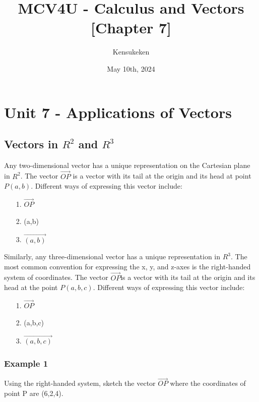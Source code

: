 \documentclass{article}
\title{MCV4U - Calculus and Vectors [Chapter 7]}
\author{Kensukeken}
\date{May 10th, 2024}
\begin{document}
\maketitle

\tableofcontents
\newpage
\section{Unit 7 -  Applications of Vectors}
\subsection{Vectors in $R^2$ and $R^3$}
Any two-dimensional vector has a unique representation on the Cartesian plane in $R^2$.  The vector $\overrightarrow{OP}$ is a vector with its tail at the origin and its head at point $P(a,b)$. Different ways of expressing this vector include:
\begin{enumerate}
    \item[1.] $\overrightarrow{OP}$
    \item[2.](a,b)
    \item[3.] $\overrightarrow{(a,b)}$
\end{enumerate}
Similarly, any three-dimensional vector has a unique representation in $R^3$. The most common convention for expressing the x, y, and z-axes is the right-handed system of coordinates.  The vector $\overrightarrow{OP}$is a vector with its tail at the origin and its head at the point $P(a,b,c)$. Different ways of expressing this vector include:
\begin{enumerate}
    \item[1.] $\overrightarrow{OP}$
    \item[2.](a,b,c)
    \item[3.] $\overrightarrow{(a,b,c)}$
\end{enumerate}
\subsubsection*{Example 1} Using the right-handed system, sketch the vector $\overrightarrow{OP}$ where the coordinates of point P are (6,2,4).
\begin{center}
\centering
\end{center}
\end{document}
